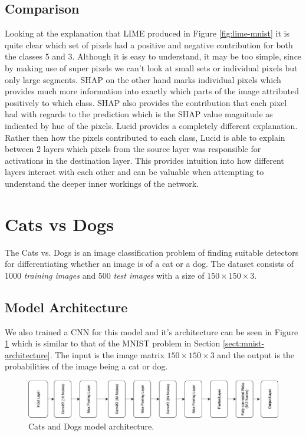 \subsection{Comparison} \label{sect:mnist-comparison}
Looking at the explanation that LIME produced in Figure \ref{fig:lime-mnist} it is quite clear which set of pixels had a positive and negative contribution for both the classes 5 and 3. Although it is easy to understand, it may be too simple, since by making use of super pixels we can't look at small sets or individual pixels but only large segments. SHAP on the other hand marks individual pixels which provides much more information into exactly which parts of the image attributed positively to which class. SHAP also provides the contribution that each pixel had with regards to the prediction which is the SHAP value magnitude as indicated by hue of the pixels. Lucid provides a completely different explanation. Rather then how the pixels contributed to each class, Lucid is able to explain between 2 layers which pixels from the source layer was responsible for activations in the destination layer. This provides intuition into how different layers interact with each other and can be valuable when attempting to understand the deeper inner workings of the network.
\section{Cats vs Dogs}

The Cats vs. Dogs is an image classification problem of finding suitable detectors for differentiating whether an image is of a cat or a dog. The dataset consists of 1000 \emph{training images} and  500 \emph{test images} with a size of $150\times150\times3$. 
\subsection{Model Architecture}
We also trained a CNN for this model and it's architecture can be seen in Figure \ref{fig:cats-dogs-architecture} which is similar to that of the MNIST problem in Section \ref{sect:mnist-architecture}. The input is the image matrix $150\times150\times3$ and the output is the probabilities of the image being a cat or dog.
\begin  {figure}[!htpb]
  \includegraphics[width=\linewidth]{Evaluation_Images/Cats_Dogs_architecture.png}
   \caption{Cats and Dogs model architecture.}
    \label{fig:cats-dogs-architecture}
\end{figure}

